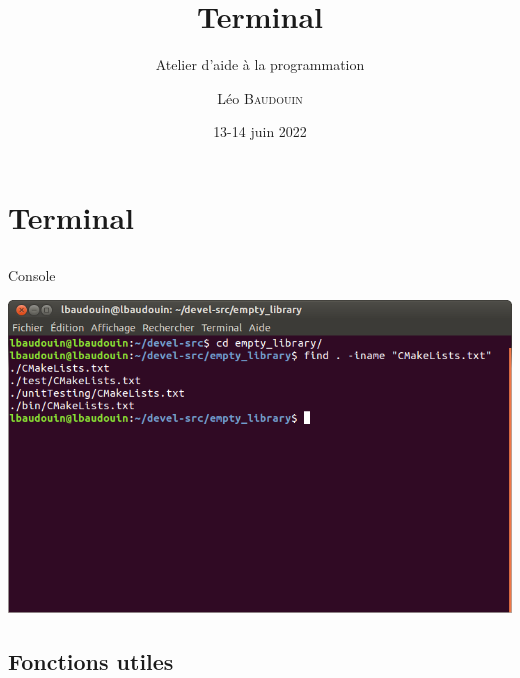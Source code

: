 \documentclass{beamer}
\title{Terminal}
\subtitle{Atelier d'aide à la programmation}
\author{L\'eo \textsc{Baudouin}}
\institute{
  {\url{baudouin.leo @ gmail.com}}
}
\date{13-14 juin 2022}
\begin{document}
\begin{frame}
  \titlepage
\end{frame}


\section{Terminal}

\subsection{}

\begin{frame}{Console}

\includegraphics[width=\linewidth]{images/terminal-exemple}

\end{frame}

\subsection{Fonctions utiles}
\end{document}
